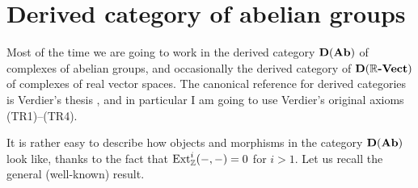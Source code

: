 
\section{Derived category of abelian groups}
\label{section:preliminaries-on-DAb}

Most of the time we are going to work in the derived category
$\text{\bf D} (\text{\bf Ab})$ of complexes of abelian groups, and occasionally the
derived category of $\text{\bf D} (\mathbb{R}\text{\bf -Vect})$ of complexes of real vector
spaces. The canonical reference for derived categories is Verdier's thesis
\cite{Verdier-thesis}, and in particular I am going to use Verdier's original
axioms (TR1)--(TR4).

\vspace{1em}

It is rather easy to describe how objects and morphisms in the category
$\text{\bf D} (\text{\bf Ab})$ look like, thanks to the fact that
$\operatorname{Ext}^i_{\mathbb{Z}} (-,-) = 0$ for $i > 1$. Let us recall the general (well-known)
result.

